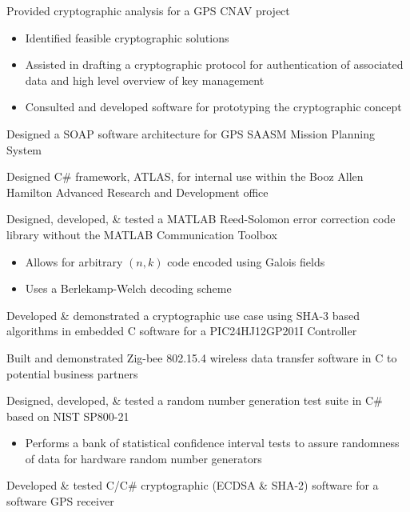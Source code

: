 \documentclass[letterpaper]{clinton-resume}
\begin{document}
\begin{minipage}[t]{0.66\textwidth}

\begin{tightitemize}
\item Provided cryptographic analysis for a GPS CNAV project
	\begin{itemize}
	\item Identified feasible cryptographic solutions
	\item Assisted in drafting a cryptographic protocol for authentication of associated data and high level overview of key management
	\item Consulted and developed software for prototyping the cryptographic concept
	\end{itemize}
\item Designed a SOAP software architecture for GPS SAASM Mission Planning System
\item Designed C\# framework, ATLAS, for internal use within the Booz Allen Hamilton Advanced Research and Development office
\item Designed, developed, \& tested a MATLAB Reed-Solomon error correction code library without the MATLAB Communication Toolbox
	\begin{itemize}
	\item Allows for arbitrary $(n,k)$ code encoded using Galois fields
	\item Uses a Berlekamp-Welch decoding scheme
	\end{itemize}
\item Developed \& demonstrated a cryptographic use case using SHA-3 based algorithms in embedded C software for a PIC24HJ12GP201I Controller
\item Built and demonstrated Zig-bee 802.15.4 wireless data transfer software in C to potential business partners
\item Designed, developed, \& tested a random number generation test suite in C\# based on NIST SP800-21
	\begin{itemize}
	\item Performs a bank of statistical confidence interval tests to assure randomness of data for hardware random number generators
	\end{itemize}
\item Developed \& tested C/C\# cryptographic (ECDSA \& SHA-2) software for a software GPS receiver 
\begin{itemize}

\end{itemize}
\end{tightitemize}
\end{minipage}
\end{document}
